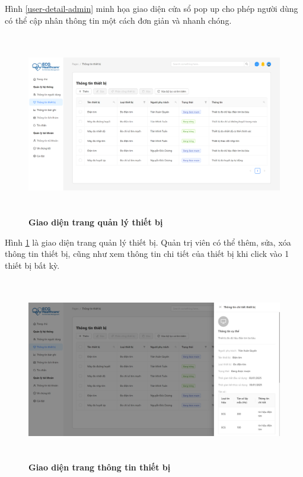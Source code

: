 Hình \ref{user-detail-admin} minh họa giao diện cửa sổ pop up cho phép người dùng có thể cập nhân thông tin một cách đơn giản và nhanh chóng.

\begin{figure}[H]
	\centering
	\includegraphics[width=15cm,height=8cm]{Images/admin_ui/devices.png}
	\caption[Giao diện trang quản lý thiết bị]{\bfseries \fontsize{12pt}{0pt}\selectfont Giao diện trang quản lý thiết bị}
	\label{devices-admin}
\end{figure}

Hình \ref{devices-admin} là giao diện trang quản lý thiết bị. Quản trị viên có thể thêm, sửa, xóa thông tin thiết bị, cũng như xem thông tin chi tiết của thiết bị khi click vào 1 thiết bị bất kỳ.

\begin{figure}[H]
	\centering
	\includegraphics[width=15cm,height=8cm]{Images/admin_ui/device-info.png}
	\caption[Giao diện trang thông tin thiết bị]{\bfseries \fontsize{12pt}{0pt}\selectfont Giao diện trang thông tin thiết bị}
	\label{device-info-admin}
\end{figure}

